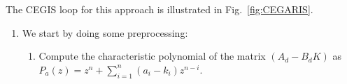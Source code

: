\documentclass[twocolumn]{autart}    %
\newcommand{\mat}[1]{{#1}}
\begin{document}
The CEGIS loop for this approach is illustrated in Fig.~\ref{fig:CEGARIS}.



\begin{enumerate}
\item 
  We start by doing some preprocessing:%
  \begin{enumerate}
\item Compute the characteristic polynomial of the matrix $(A_d-B_dK)$ as 
$P_a(z) = z^n+\sum_{i=1}^n{(a_i-k_i)z^{n-i}}$. 




\end{enumerate}
\end{enumerate}
\end{document}
